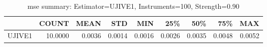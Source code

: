 \begin{table}[ht]
\centering
\caption{mse summary: Estimator=UJIVE1, Instruments=100, Strength=0.90}
\begin{tabular}{lrrrrrrrr}
\toprule
 & COUNT & MEAN & STD & MIN & 25\% & 50\% & 75\% & MAX \\
\midrule
UJIVE1 & 10.0000 & 0.0036 & 0.0014 & 0.0016 & 0.0026 & 0.0035 & 0.0048 & 0.0052 \\
\bottomrule
\end{tabular}
\end{table}
